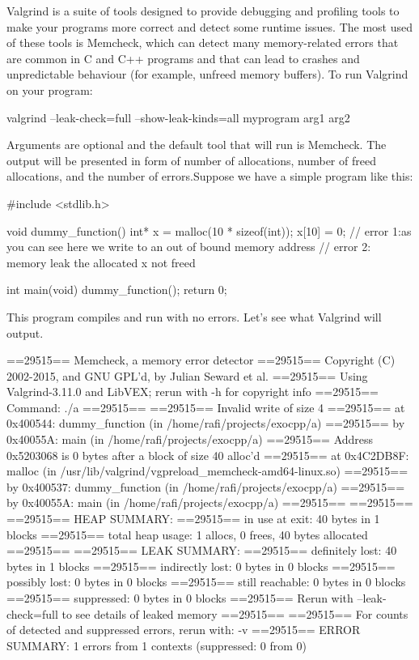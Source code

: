 Valgrind is a suite of tools designed to provide debugging and profiling tools to make your programs more correct and detect some runtime issues. The most used of these tools is Memcheck, which can detect many memory-related errors that are common in C and C++ programs and that can lead to crashes and unpredictable behaviour (for example, unfreed memory buffers). To run Valgrind on your program:

\begin{code}[language=C]
valgrind --leak-check=full --show-leak-kinds=all myprogram arg1 arg2
\end{code}

Arguments are optional and the default tool that will run is Memcheck. The output will be presented in form of number of allocations, number of freed allocations, and the number of errors.Suppose we have a simple program like this:

\begin{code}[language=C]
#include <stdlib.h>

void dummy_function() {
	int* x = malloc(10 * sizeof(int));
	x[10] = 0;        // error 1:as you can see here we write to an out of bound memory address
}                    // error 2: memory leak the allocated x not freed

int main(void) {
	dummy_function();
	return 0;
}
\end{code}

This program compiles and run with no errors. Let's see what Valgrind will output.

\begin{code}[language=C]
==29515== Memcheck, a memory error detector
==29515== Copyright (C) 2002-2015, and GNU GPL'd, by Julian Seward et al.
==29515== Using Valgrind-3.11.0 and LibVEX; rerun with -h for copyright info
==29515== Command: ./a
==29515== 
==29515== Invalid write of size 4
==29515==    at 0x400544: dummy_function (in /home/rafi/projects/exocpp/a)
==29515==    by 0x40055A: main (in /home/rafi/projects/exocpp/a)
==29515==  Address 0x5203068 is 0 bytes after a block of size 40 alloc'd
==29515==    at 0x4C2DB8F: malloc (in /usr/lib/valgrind/vgpreload_memcheck-amd64-linux.so)
==29515==    by 0x400537: dummy_function (in /home/rafi/projects/exocpp/a)
==29515==    by 0x40055A: main (in /home/rafi/projects/exocpp/a)
==29515== 
==29515== 
==29515== HEAP SUMMARY:
==29515==     in use at exit: 40 bytes in 1 blocks
==29515==   total heap usage: 1 allocs, 0 frees, 40 bytes allocated
==29515== 
==29515== LEAK SUMMARY:
==29515==    definitely lost: 40 bytes in 1 blocks
==29515==    indirectly lost: 0 bytes in 0 blocks
==29515==      possibly lost: 0 bytes in 0 blocks
==29515==    still reachable: 0 bytes in 0 blocks
==29515==         suppressed: 0 bytes in 0 blocks
==29515== Rerun with --leak-check=full to see details of leaked memory
==29515== 
==29515== For counts of detected and suppressed errors, rerun with: -v
==29515== ERROR SUMMARY: 1 errors from 1 contexts (suppressed: 0 from 0)
\end{code}

